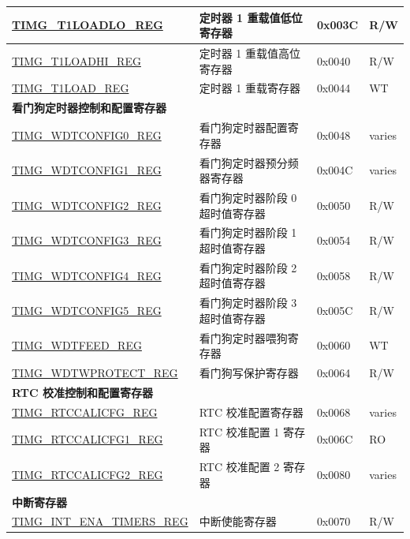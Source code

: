 \begin{longtable}{ | p{6cm} | p{7.2cm} | p{1.3cm} | p{1cm} | }
    \hyperref[regdesc:TIMGTXLOADLOREG]{TIMG\_T1LOADLO\_REG} & 定时器 1 重载值低位寄存器 & 0x003C & R/W \\ \hline
    \hyperref[regdesc:TIMGTXLOADHIREG]{TIMG\_T1LOADHI\_REG} & 定时器 1 重载值高位寄存器 & 0x0040 & R/W \\ \hline
    \hyperref[regdesc:TIMGTXLOADREG]{TIMG\_T1LOAD\_REG} & 定时器 1 重载寄存器 & 0x0044 & WT \\ \hline
    \multicolumn{4}{|l|}{\textbf{看门狗定时器控制和配置寄存器}} \\ \hline
    \hyperref[regdesc:TIMGWDTCONFIG0REG]{TIMG\_WDTCONFIG0\_REG} & 看门狗定时器配置寄存器 & 0x0048 & varies \\ \hline
    \hyperref[regdesc:TIMGWDTCONFIG1REG]{TIMG\_WDTCONFIG1\_REG} & 看门狗定时器预分频器寄存器 & 0x004C & varies \\ \hline
    \hyperref[regdesc:TIMGWDTCONFIG2REG]{TIMG\_WDTCONFIG2\_REG} & 看门狗定时器阶段 0 超时值寄存器 & 0x0050 & R/W \\ \hline
    \hyperref[regdesc:TIMGWDTCONFIG3REG]{TIMG\_WDTCONFIG3\_REG} & 看门狗定时器阶段 1 超时值寄存器 & 0x0054 & R/W \\ \hline
    \hyperref[regdesc:TIMGWDTCONFIG4REG]{TIMG\_WDTCONFIG4\_REG} & 看门狗定时器阶段 2 超时值寄存器 & 0x0058 & R/W \\ \hline
    \hyperref[regdesc:TIMGWDTCONFIG5REG]{TIMG\_WDTCONFIG5\_REG} & 看门狗定时器阶段 3 超时值寄存器 & 0x005C & R/W \\ \hline
    \hyperref[regdesc:TIMGWDTFEEDREG]{TIMG\_WDTFEED\_REG} & 看门狗定时器喂狗寄存器 & 0x0060 & WT \\ \hline
    \hyperref[regdesc:TIMGWDTWPROTECTREG]{TIMG\_WDTWPROTECT\_REG} & 看门狗写保护寄存器 & 0x0064 & R/W \\ \hline
    \multicolumn{4}{|l|}{\textbf{RTC 校准控制和配置寄存器}} \\ \hline
    \hyperref[regdesc:TIMGRTCCALICFGREG]{TIMG\_RTCCALICFG\_REG} & RTC 校准配置寄存器 & 0x0068 & varies \\ \hline
    \hyperref[regdesc:TIMGRTCCALICFG1REG]{TIMG\_RTCCALICFG1\_REG} & RTC 校准配置 1 寄存器 & 0x006C & RO \\ \hline
    \hyperref[regdesc:TIMGRTCCALICFG2REG]{TIMG\_RTCCALICFG2\_REG} & RTC 校准配置 2 寄存器 & 0x0080 & varies \\ \hline
    \multicolumn{4}{|l|}{\textbf{中断寄存器}} \\ \hline
    \hyperref[regdesc:TIMGINTENATIMERSREG]{TIMG\_INT\_ENA\_TIMERS\_REG} & 中断使能寄存器 & 0x0070 & R/W \\ \hline

\end{longtable}
